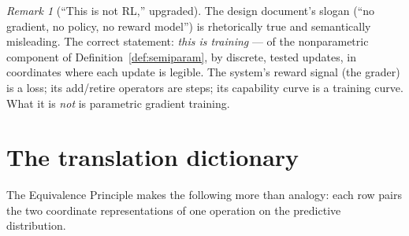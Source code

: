 \documentclass[11pt]{article}
\theoremstyle{plain}
\theoremstyle{definition}
\theoremstyle{remark}
\newtheorem{remark}[theorem]{Remark}
\begin{document}
\begin{remark}[``This is not RL,'' upgraded]
The design document's slogan (``no gradient, no policy, no reward model'')
is rhetorically true and semantically misleading. The correct statement:
\emph{this is training} --- of the nonparametric component of
Definition~\ref{def:semiparam}, by discrete, tested updates, in coordinates
where each update is legible. The system's reward signal (the grader) is a
loss; its add/retire operators are steps; its capability curve is a training
curve. What it is \emph{not} is parametric gradient training.
\end{remark}

\section{The translation dictionary}\label{sec:dictionary}

The Equivalence Principle makes the following more than analogy: each row
pairs the two coordinate representations of one operation on the predictive
distribution.
\end{document}

